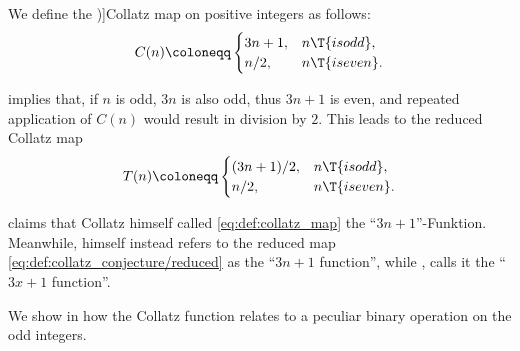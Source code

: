 \begin{definition}\label{def:collatz_map}
  We define the \term[en=Collatz function (\cite[1]{Lagarias2021CollatzOverview})]{Collatz map} on positive integers as follows:
  \begin{equation}\label{eq:def:collatz_map}
    C(n) \coloneqq \begin{cases}
      3n + 1, &n \T{is odd}, \\
      n / 2,  &n \T{is even}.
    \end{cases}
  \end{equation}
\end{definition}
\begin{comments}
  \item {} implies that, if \( n \) is odd, \( 3n \) is also odd, thus \( 3n + 1 \) is even, and repeated application of \( C(n) \) would result in division by \( 2 \). This leads to the reduced Collatz map
  \begin{equation}\label{eq:def:collatz_conjecture/reduced}
    T(n) \coloneqq \begin{cases}
      (3n + 1) / 2, &n \T{is odd}, \\
      n / 2,        &n \T{is even}.
    \end{cases}
  \end{equation}

  \item \Textcite[11]{Wirsching1998CollatzDynamicalSystem} claims that Collatz himself called \eqref{eq:def:collatz_map} the \enquote{\( 3n + 1 \)}-Funktion. Meanwhile, \textcite[11]{Wirsching1998CollatzDynamicalSystem} himself instead refers to the reduced map \eqref{eq:def:collatz_conjecture/reduced} as the \enquote{\( 3n + 1 \) function}, while \textcite[4]{Lagarias2021CollatzOverview}, calls it the \enquote{\( 3x + 1 \) function}.

  \item We show in  how the Collatz function relates to a peculiar binary operation on the odd integers.
\end{comments}


